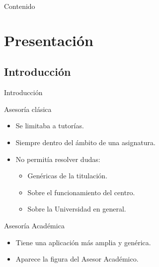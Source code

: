 \documentclass[10pt, hyperref={pdfpagelabels=false}]{beamer}
\begin{document}


   \begin{frame}{Contenido}
    \tableofcontents[hideallsubsections]
   \end{frame}

  \section{Presentación}
    \subsection{Introducción}
      \begin{frame}{Introducción}
        \begin{block}{Asesoría clásica}
          \begin{itemize}
          \item Se limitaba a tutorías.
          \item Siempre dentro del ámbito de una asignatura.
          \item No permitía resolver dudas:
          \begin{itemize}
            \item Genéricas de la titulación.
            \item Sobre el funcionamiento del centro.
            \item Sobre la Universidad en general.
          \end{itemize}
          \end{itemize}
        \end{block}
        \begin{block}{Asesoría Académica}
          \begin{itemize}
          \item Tiene una aplicación más amplia y genérica.
          \item Aparece la figura del Asesor Académico.
          \end{itemize}
        \end{block}
      \end{frame}
\end{document}
